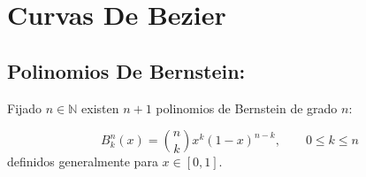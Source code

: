 \documentclass[ebook,oneside]{memoir}
\begin{document}
\section{Curvas De Bezier}

\subsection{Polinomios De Bernstein:}

Fijado $n\in \mathbb{N}$ existen $n+1$ polinomios de Bernstein de grado $n$:

$$B_k^n(x)=\binom{n}{k} x^k (1-x)^{n-k},\quad \quad 0\leq k\leq n$$
definidos generalmente para $x\in [0,1].$

%
%
%
%
\end{document}
